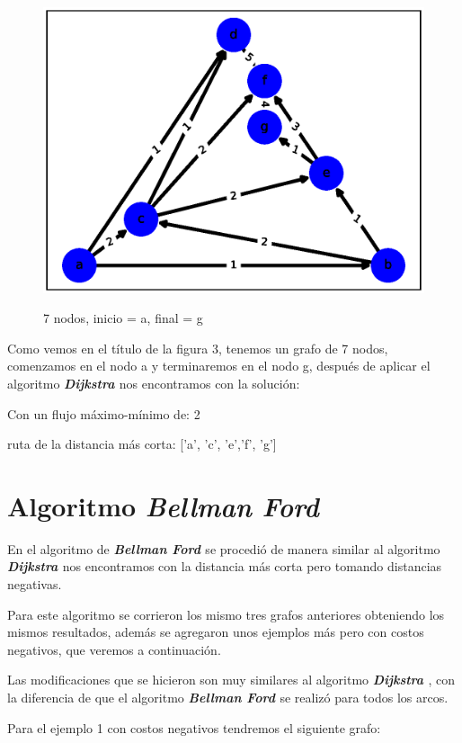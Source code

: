 \documentclass{report}
\newcommand{\dij}{{\bfseries {\textit{Dijkstra }}}}
\newcommand{\bell}{{\bfseries {\textit{Bellman Ford }}}}
\begin{document}
\begin{figure}[h!t]
    \centering
    \includegraphics[scale = 0.4]{ejemplo3.eps}
    \label{figura3}
    \caption{7 nodos, inicio = a, final = g}
\end{figure}

Como vemos en el título de la  figura 3, tenemos un grafo de 7 nodos, comenzamos en el nodo a y terminaremos en el nodo g, después de aplicar el algoritmo  \dij nos encontramos con la solución:
\begin{center}
    Con un flujo máximo-mínimo de: 
    2

    ruta de la distancia más corta:
    ['a', 'c', 'e','f', 'g']
\end{center}

\section{Algoritmo \bell}

En el algoritmo de \bell se procedió de manera similar al algoritmo \dij nos encontramos con la distancia más corta pero tomando distancias negativas.

Para este algoritmo se corrieron los mismo tres grafos anteriores obteniendo los mismos resultados, además se agregaron unos ejemplos más pero con costos negativos, que veremos a continuación.

Las modificaciones que se hicieron son muy similares al algoritmo \dij, con la diferencia de que el algoritmo \bell se realizó para todos los arcos.

Para el ejemplo 1 con costos negativos tendremos el siguiente grafo:
\end{document}
